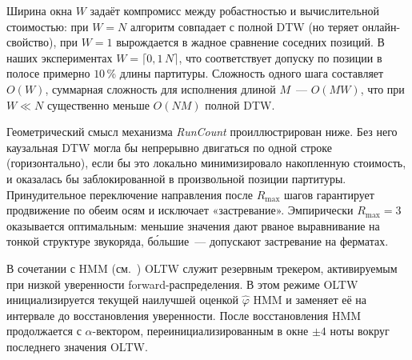 Ширина окна $W$ задаёт компромисс между робастностью и
вычислительной стоимостью: при $W=N$ алгоритм совпадает с полной
DTW (но теряет онлайн-свойство), при $W=1$ вырождается в жадное
сравнение соседних позиций. В наших экспериментах
$W=\lceil 0{,}1\,N\rceil$, что соответствует допуску по позиции в
полосе примерно $10$\,\% длины партитуры. Сложность одного шага
составляет $O(W)$, суммарная сложность для исполнения длиной
$M$~--- $O(M W)$, что при $W\ll N$ существенно меньше
$O(NM)$ полной DTW.

Геометрический смысл механизма \textit{RunCount} проиллюстрирован
ниже. Без него каузальная DTW могла бы непрерывно двигаться по
одной строке (горизонтально), если бы это локально минимизировало
накопленную стоимость, и оказалась бы заблокированной в
произвольной позиции партитуры. Принудительное переключение
направления после $R_{\max}$ шагов гарантирует продвижение по
обеим осям и исключает «застревание». Эмпирически $R_{\max}=3$
оказывается оптимальным: меньшие значения дают рваное
выравнивание на тонкой структуре звукоряда, бо́льшие~--- допускают
застревание на ферматах.

В сочетании с HMM (см.~) OLTW служит резервным
трекером, активируемым при низкой уверенности forward-распределения.
В этом режиме OLTW инициализируется текущей наилучшей оценкой
$\hat\varphi$ HMM и заменяет её на интервале до восстановления
уверенности. После восстановления HMM продолжается с
$\alpha$-вектором, переинициализированным в окне $\pm 4$ ноты
вокруг последнего значения OLTW.
